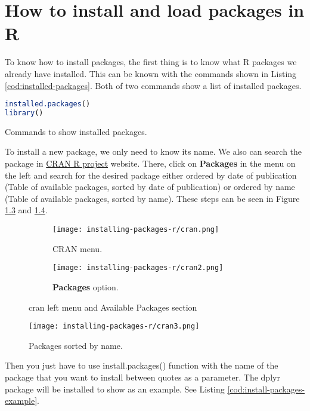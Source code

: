 \chapter{How to install and load packages in R}
\label{cha:install-load-packages}

To know how to install packages, the first thing is to know what R packages we already have installed. This can be known with the commands shown in Listing \ref{cod:installed-packages}. Both of two commands show a list of installed packages.

\begin{codefloat}
\begin{lstlisting}[language=R, style=Ccolor]
installed.packages()
library()
\end{lstlisting}
\caption{Commands to show installed packages.}
\label{cod:installed-packages}
\end{codefloat}

To install a new package, we only need to know its name. We also can search the package in \href{https://cran.r-project.org/}{CRAN R project} website. There, click on \textbf{Packages} in the menu on the left and search for the desired package either ordered by date of publication (Table of available packages, sorted by date of publication) or ordered by name (Table of available packages, sorted by name). These steps can be seen in Figure \ref{fig:cran-website} and \ref{fig:packages-by-name}.

\begin{figure}[H]
  \begin{subfigure}[b]{0.39\textwidth}
    \texttt{[image: installing-packages-r/cran.png]}
    \caption{CRAN menu.}
    \label{fig:cran-menu}
  \end{subfigure}
  \hfill
  \begin{subfigure}[b]{0.59\textwidth}
    \texttt{[image: installing-packages-r/cran2.png]}
    \caption{\textbf{Packages} option.}
    \label{fig:packages-option}
  \end{subfigure}
  \caption{\acrshort{cran} left menu and Available Packages section}
  \label{fig:cran-website}
\end{figure}
\begin{figure}[H]
    \centering
    \texttt{[image: installing-packages-r/cran3.png]}
    \caption{Packages sorted by name.}
    \label{fig:packages-by-name}
\end{figure}

Then you just have to use install.packages() function with the name of the package that you want to install between quotes as a parameter. The dplyr package will be installed to show as an example. See Listing \ref{cod:install-packages-example}.

